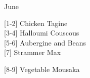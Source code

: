 		\begin{menu}{June}
    
    \begin{recipelist}
    
        {\scriptsize[1-2]} Chicken Tagine\\
        {\scriptsize[3-4]} Halloumi Couscous\\
        {\scriptsize[5-6]} Aubergine and Beans\\
        {\scriptsize[7]} Strammer Max\\%
    \end{recipelist}%
    \begin{recipelist}
    
        {\scriptsize[8-9]} Vegetable Mousaka\\
    \end{recipelist}\par%
  

\end{menu}
